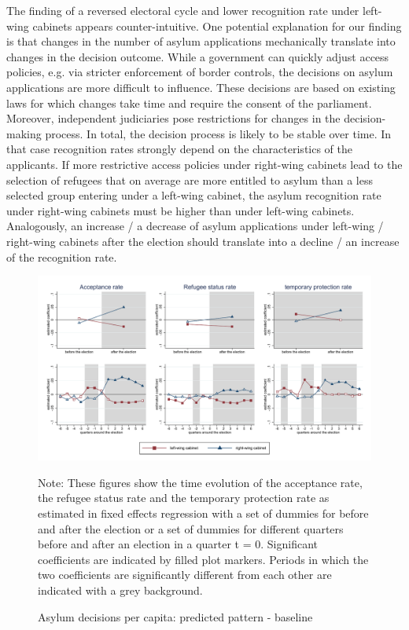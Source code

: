 \documentclass[a4paper,12pt]{article}
\begin{document}
The finding of a reversed electoral cycle and lower recognition rate under left-wing cabinets appears counter-intuitive. One potential explanation for our finding is that changes in the number of asylum applications mechanically translate into changes in the decision outcome. While a government can quickly adjust access policies, e.g. via stricter enforcement of border controls, the decisions on asylum applications are more difficult to influence. These decisions are based on existing laws for which changes take time and require the consent of the parliament. Moreover, independent judiciaries pose restrictions for changes in the decision-making process. In total, the decision process is likely to be stable over time. In that case  recognition rates strongly depend on the characteristics of the applicants. If more restrictive access policies under right-wing cabinets lead to the selection of refugees that on average are more entitled to asylum than a less selected group entering under a left-wing cabinet, the asylum recognition rate under right-wing cabinets must be higher than under left-wing cabinets. Analogously, an increase / a decrease of asylum applications under left-wing / right-wing cabinets after the election should translate into a decline / an increase of the recognition rate.


\begin{figure}
	\caption{Asylum decisions per capita: predicted pattern - baseline}
	\centering
	\begin{minipage}{1\textwidth} 
		\includegraphics[width=\linewidth]{../results/decisions/dec_graphs_baseline.pdf}
		{\scriptsize Note: These figures show the time evolution of the acceptance rate, the refugee status rate and the temporary protection rate as estimated in fixed effects regression with a set of dummies for before and after the election or a set of dummies for different quarters before and after an election in a quarter t = 0. Significant coefficients are indicated by filled plot markers. Periods in which the two coefficients are significantly different from each other are indicated with a grey background. \par}
	\end{minipage}
\label{dec_graphs_baseline}
\end{figure}
\end{document}
